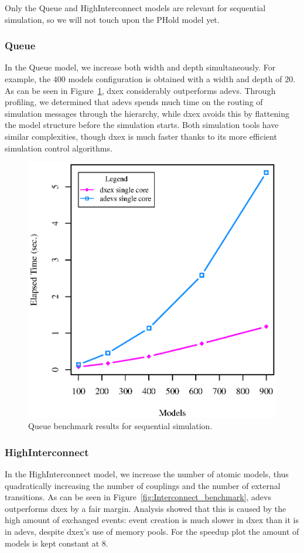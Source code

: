 Only the Queue and HighInterconnect models are relevant for sequential simulation, so we will not touch upon the PHold model yet.

\subsubsection{Queue}
In the Queue model, we increase both width and depth simultaneously.
For example, the $400$ models configuration is obtained with a width and depth of $20$.
As can be seen in Figure~\ref{fig:Queue_benchmark}, dxex considerably outperforms adevs.
Through profiling, we determined that adevs spends much time on the routing of simulation messages through the hierarchy, while dxex avoids this by flattening the model structure before the simulation starts.
Both simulation tools have similar complexities, though dxex is much faster thanks to its more efficient simulation control algorithms.

\begin{figure}
    \center
	\includegraphics[width=\plotfraction\columnwidth]{fig/queue_sequential.eps}
	\caption{Queue benchmark results for sequential simulation.}
	\label{fig:Queue_benchmark}
\end{figure}

\subsubsection{HighInterconnect}
In the HighInterconnect model, we increase the number of atomic models, thus quadratically increasing the number of couplings and the number of external transitions.
As can be seen in Figure~\ref{fig:Interconnect_benchmark}, adevs outperforms dxex by a fair margin.
Analysis showed that this is caused by the high amount of exchanged events: event creation is much slower in dxex than it is in adevs, despite dxex's use of memory pools. For the speedup plot the amount of models is kept constant at 8.


